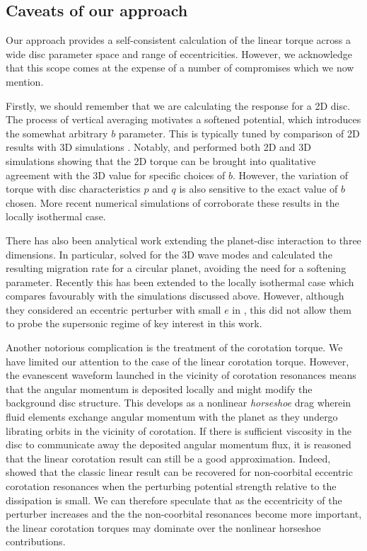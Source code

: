 \subsection{Caveats of our approach}
\label{subsection:caveats}

Our approach provides a self-consistent calculation of the linear torque across a wide disc parameter space and range of eccentricities. However, we acknowledge that this scope comes at the expense of a number of compromises which we now mention.

Firstly, we should remember that we are calculating the response for a 2D disc. The process of vertical averaging motivates a softened potential, which introduces the somewhat arbitrary $b$ parameter. This is typically tuned by comparison of 2D results with 3D simulations \citep[e.g.][]{CresswellNelson_2006}. Notably, \cite{Cresswell2007} and \cite{DAngeloLubow_2010} performed both 2D and 3D simulations showing that the 2D torque can be brought into qualitative agreement with the 3D value for specific choices of $b$.  However, the variation of torque with disc characteristics $p$ and $q$ is also sensitive to the exact value of $b$ chosen. More recent numerical simulations of \cite{JimenezMasset_2017a} corroborate these results in the locally isothermal case.

There has also been analytical work extending the planet-disc interaction to three dimensions. In particular, \cite{TanakaEtAl_2002} solved for the 3D wave modes and calculated the resulting migration rate for a circular planet, avoiding the need for a softening parameter. Recently this has been extended to the locally isothermal case \citep{TanakaOkada_2024} which compares favourably with the simulations discussed above. However, although they considered an eccentric perturber with small $e$ in \cite{TanakaWard_2004}, this did not allow them to probe the supersonic regime of key interest in this work.

Another notorious complication is the treatment of the corotation torque. We have limited our attention to the case of the linear corotation torque. However, the evanescent waveform launched in the vicinity of corotation resonances \citep{GoldreichTremaine_1979} means that the angular momentum is deposited locally and might modify the background disc structure. This develops as a nonlinear \textit{horseshoe} drag \citep[e.g.][]{Ward_1991, PaardekooperEtAl_2010} wherein fluid elements exchange angular momentum with the planet as they undergo librating orbits in the vicinity of corotation. If there is sufficient viscosity in the disc to communicate away the deposited angular momentum flux, it is reasoned that the linear corotation result can still be a good approximation. Indeed, \cite{OgilvieLubow_2003} showed that the classic linear result can be recovered for non-coorbital eccentric corotation resonances when the perturbing potential strength relative to the dissipation is small. We can therefore speculate that as the eccentricity of the perturber increases and the the non-coorbital resonances become more important, the linear corotation torques may dominate over the nonlinear horseshoe contributions. 

